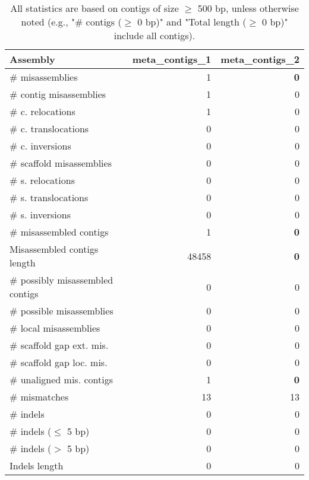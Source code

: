 \documentclass[12pt,a4paper]{article}
\begin{document}
\begin{table}[ht]
\begin{center}
\caption{All statistics are based on contigs of size $\geq$ 500 bp, unless otherwise noted (e.g., "\# contigs ($\geq$ 0 bp)" and "Total length ($\geq$ 0 bp)" include all contigs).}
\begin{tabular}{|l*{2}{|r}|}
\hline
Assembly & meta\_contigs\_1 & meta\_contigs\_2 \\ \hline
\# misassemblies & 1 & {\bf 0} \\ \hline
\hspace{2mm}\# contig misassemblies & 1 & 0 \\ \hline
\hspace{5mm}\# c. relocations & 1 & 0 \\ \hline
\hspace{5mm}\# c. translocations & 0 & 0 \\ \hline
\hspace{5mm}\# c. inversions & 0 & 0 \\ \hline
\hspace{2mm}\# scaffold misassemblies & 0 & 0 \\ \hline
\hspace{5mm}\# s. relocations & 0 & 0 \\ \hline
\hspace{5mm}\# s. translocations & 0 & 0 \\ \hline
\hspace{5mm}\# s. inversions & 0 & 0 \\ \hline
\# misassembled contigs & 1 & {\bf 0} \\ \hline
Misassembled contigs length & 48458 & {\bf 0} \\ \hline
\# possibly misassembled contigs & 0 & 0 \\ \hline
\hspace{5mm}\# possible misassemblies & 0 & 0 \\ \hline
\# local misassemblies & 0 & 0 \\ \hline
\# scaffold gap ext. mis. & 0 & 0 \\ \hline
\# scaffold gap loc. mis. & 0 & 0 \\ \hline
\# unaligned mis. contigs & 1 & {\bf 0} \\ \hline
\# mismatches & 13 & 13 \\ \hline
\# indels & 0 & 0 \\ \hline
\hspace{5mm}\# indels ($\leq$ 5 bp) & 0 & 0 \\ \hline
\hspace{5mm}\# indels ($>$ 5 bp) & 0 & 0 \\ \hline
Indels length & 0 & 0 \\ \hline
\end{tabular}
\end{center}
\end{table}
\end{document}
